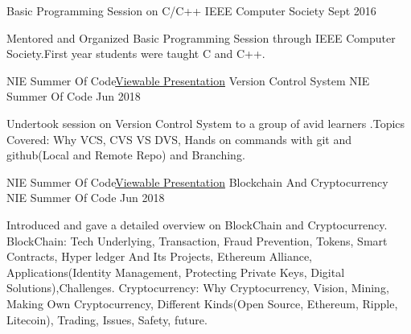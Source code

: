 

\begin{cventries}
\cventry
    {}%
    {Basic Programming Session on C/C++} %
    {IEEE Computer Society} %
    {Sept 2016} %
    {
      \begin{cvitems} %
        \item {Mentored and Organized Basic Programming Session through IEEE Computer Society.First year students were taught C and C++.}
      \end{cvitems}
    }

\end{cventries}
\begin{cventries}
\cventry
    {NIE Summer Of Code\quad\textbar\quad \href{https://goo.gl/767dBZ}{Viewable Presentation}}%
    {Version Control System} %
    {NIE Summer Of Code} %
    {Jun 2018} %
    {
      \begin{cvitems} %
        \item {Undertook session on Version Control System to a group of avid learners .\newline{}Topics Covered: Why VCS, CVS VS DVS, Hands on commands with git and github(Local and Remote Repo) and Branching.}
      \end{cvitems}
    }

\end{cventries}



  \cventry
    {NIE Summer Of Code\quad\textbar\quad \href{https://goo.gl/TEFiwH}{Viewable Presentation}}  %
    {Blockchain And Cryptocurrency} %
    {NIE Summer Of Code} %
    {Jun 2018} %
    {
      \begin{cvitems} %
        \item {Introduced and gave a detailed overview on BlockChain and Cryptocurrency.
\newline{}BlockChain: Tech Underlying, Transaction, Fraud Prevention, Tokens, Smart Contracts, Hyper ledger And Its Projects, Ethereum Alliance, Applications(Identity Management, Protecting Private Keys, Digital Solutions),Challenges.
\newline{}Cryptocurrency: Why Cryptocurrency, Vision, Mining, Making Own Cryptocurrency, Different Kinds(Open Source, Ethereum, Ripple, Litecoin), Trading, Issues, Safety, future.
}
      \end{cvitems}
    }

  